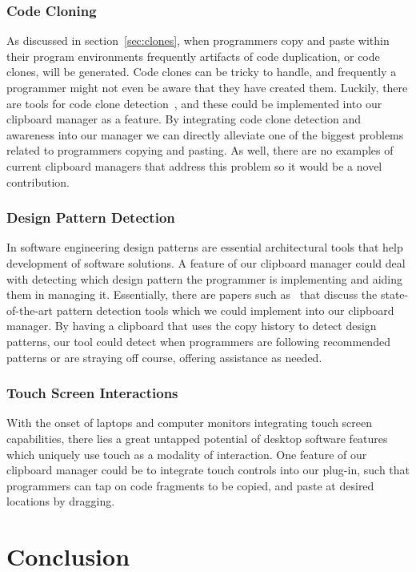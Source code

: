 \documentclass{acm_proc_article-sp}
\begin{document}
\subsubsection{Code Cloning}
As discussed in section~\ref{sec:clones}, when programmers copy and paste within their program environments frequently artifacts of code duplication, or code clones, will be generated. Code clones can be tricky to handle, and frequently a programmer might not even be aware that they have created them. Luckily, there are tools for code clone detection~\cite{CloneTag}, and these could be implemented into our clipboard manager as a feature. By integrating code clone detection and awareness into our manager we can directly alleviate one of the biggest problems related to programmers copying and pasting. As well, there are no examples of current clipboard managers that address this problem so it would be a novel contribution.

\subsubsection{Design Pattern Detection}
In software engineering design patterns are essential architectural tools that help development of software solutions. A feature of our clipboard manager could deal with detecting which design pattern the programmer is implementing and aiding them in managing it. Essentially, there are papers such as~\cite{Pattern} that discuss the state-of-the-art pattern detection tools which we could implement into our clipboard manager. By having a clipboard that uses the copy history to detect design patterns, our tool could detect when programmers are following recommended patterns or are straying off course, offering assistance as needed.

\subsubsection{Touch Screen Interactions}
With the onset of laptops and computer monitors integrating touch screen capabilities, there lies a great untapped potential of desktop software features which uniquely use touch as a modality of interaction. One feature of our clipboard manager could be to integrate touch controls into our plug-in, such that programmers can tap on code fragments to be copied, and paste at desired locations by dragging.

\section{Conclusion}\label{sec:conclusion}
\end{document}
